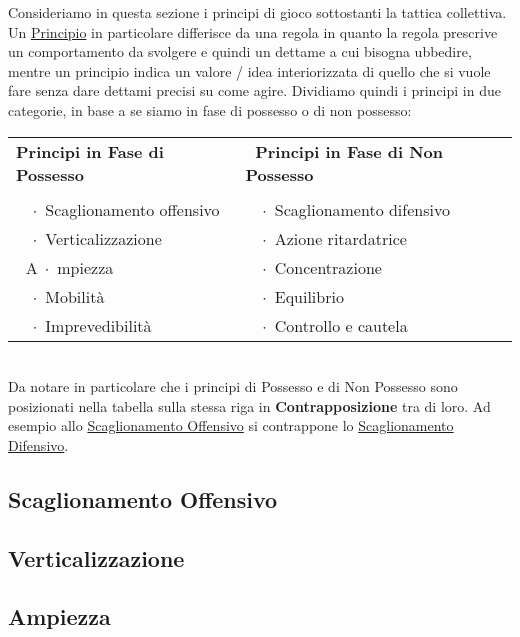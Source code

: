 \documentclass[../uefaC.tex]{subfiles}
\begin{document}
Consideriamo in questa sezione i principi di gioco sottostanti la tattica collettiva. Un \underline{Principio} in particolare differisce da una regola in quanto la regola prescrive un comportamento da svolgere e quindi un dettame a cui bisogna ubbedire, mentre un principio indica un valore / idea interiorizzata di quello che si vuole fare senza dare dettami precisi su come agire. Dividiamo quindi i principi in due categorie, in base a se siamo in fase di possesso o di non possesso:
\begin{table}[]
    \begin{tabular}{ll}
        \textbf{Principi in Fase di Possesso} & $\;$ \textbf{Principi in Fase di Non Possesso} \\
        & \\
        $\;$ $\; \cdot$ Scaglionamento offensivo              & $\;$ $\; \cdot$ Scaglionamento difensivo         \\
        $\;$ $\; \cdot$ Verticalizzazione                     & $\;$ $\; \cdot$ Azione ritardatrice              \\
        $\;$ A$\; \cdot$ mpiezza                              & $\;$ $\; \cdot$ Concentrazione                   \\
        $\;$ $\; \cdot$ Mobilità                              & $\;$ $\; \cdot$ Equilibrio                       \\
        $\;$ $\; \cdot$ Imprevedibilità                       & $\;$ $\; \cdot$ Controllo e cautela             
    \end{tabular}
\end{table}
\hfill \\ 
Da notare in particolare che i principi di Possesso e di Non Possesso sono posizionati nella tabella sulla stessa riga in \textbf{Contrapposizione} tra di loro. Ad esempio allo \underline{Scaglionamento Offensivo} si contrappone lo \underline{Scaglionamento Difensivo}.

\subsection{Scaglionamento Offensivo}

\subsection{Verticalizzazione}

\subsection{Ampiezza}
\end{document}
